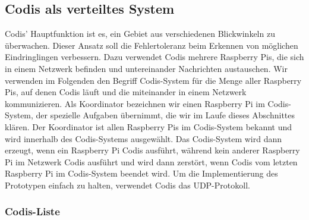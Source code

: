 \documentclass[journal]{IEEEtran}
\begin{document}
\subsection{Codis als verteiltes System}

Codis' Hauptfunktion ist es, ein Gebiet aus verschiedenen Blickwinkeln zu überwachen. Dieser Ansatz soll die Fehlertoleranz beim Erkennen von möglichen Eindringlingen verbessern. Dazu verwendet Codis mehrere Raspberry Pis, die sich in einem Netzwerk befinden und untereinander Nachrichten austauschen. Wir verwenden im Folgenden den Begriff Codis-System für die Menge aller Raspberry Pis, auf denen Codis läuft und die miteinander in einem Netzwerk kommunizieren. Als Koordinator bezeichnen wir einen Raspberry Pi im Codis-System, der spezielle Aufgaben übernimmt, die wir im Laufe dieses Abschnittes klären. Der Koordinator ist allen Raspberry Pis im Codis-System bekannt und wird innerhalb des Codis-Systems ausgewählt. Das Codis-System wird dann erzeugt, wenn ein Raspberry Pi Codis ausführt, während kein anderer Raspberry Pi im Netzwerk Codis ausführt und wird dann zerstört, wenn Codis vom letzten Raspberry Pi im Codis-System beendet wird. Um die Implementierung des Prototypen einfach zu halten, verwendet Codis das UDP-Protokoll. 

\subsubsection{Codis-Liste}
\end{document}
